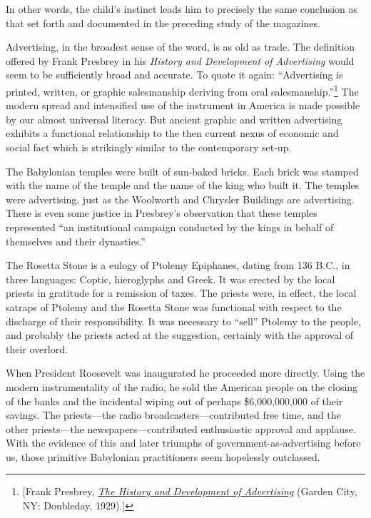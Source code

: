 \documentclass[nohyper,openany,nobib]{tufte-book}
\begin{document}
In other words, the child's instinct leads him to precisely the same
conclusion as that set forth and documented in the preceding study of
the magazines.

Advertising, in the broadest sense of the word, is as old as trade. The
definition offered by Frank Presbrey in his \emph{History and
Development of Advertising} would seem to be sufficiently broad and
accurate. To quote it again: ``Advertising is printed, written, or
graphic salesmanship deriving from oral salesmanship.''\footnote{{[}Frank Presbrey,
  \emph{\href{http://www.worldcat.org/oclc/700109}{The History and
  Development of Advertising}} (Garden City, NY: Doubleday, 1929).{]}} The modern
spread and intensified use of the instrument in America is made possible
by our almost universal literacy. But ancient graphic and written
advertising exhibits a functional relationship to the then current nexus
of economic and social fact which is strikingly similar to the
contemporary set-up.

The Babylonian temples were built of sun-baked bricks. Each brick was
stamped with the name of the temple and the name of the king who built
it. The temples were advertising, just as the Woolworth and Chrysler
Buildings are advertising. There is even some justice in Presbrey's
observation that these temples represented ``an institutional campaign
conducted by the kings in behalf of themselves and their dynasties.''

The Rosetta Stone is a eulogy of Ptolemy Epiphanes, dating from 136
B.C., in three languages: Coptic, hieroglyphs and Greek. It was erected
by the local priests in gratitude for a remission of taxes. The priests
were, in effect, the local satraps of Ptolemy and the Rosetta Stone was
functional with respect to the discharge of their responsibility. It was
necessary to ``sell'' Ptolemy to the people, and probably the priests
acted at the suggestion, certainly with the approval of their overlord.

When President Roosevelt was inaugurated he proceeded more directly.
Using the modern instrumentality of the radio, he sold the American
people on the closing of the banks and the incidental wiping out of
perhaps \$6,000,000,000 of their savings. The priests---the radio
broadcasters---contributed free time, and the other priests---the
newspapers---contributed enthusiastic approval and applause. With the
evidence of this and later triumphs of government-as-advertising before
us, those primitive Babylonian practitioners seem hopelessly outclassed.
\end{document}

